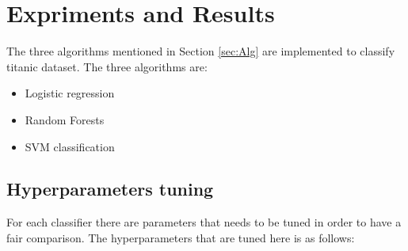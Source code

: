 %
%

\section{Expriments and Results}

The three algorithms mentioned in Section \ref{sec:Alg} are implemented to classify titanic dataset. The three algorithms are:
\begin{itemize}
	\item Logistic regression
	\item Random Forests
	\item SVM classification
\end{itemize}

\subsection{Hyperparameters tuning}
For each classifier there are parameters that needs to be tuned in order to have a fair comparison. The hyperparameters that are tuned here is as follows:
 
